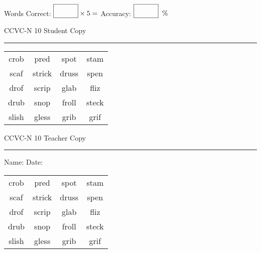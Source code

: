 \documentclass{memoir}
\begin{document}
\small

Words Correct: $\fbox{\phantom{\huge 100}} \times 5 = $ Accuracy: $\fbox{\phantom{\huge 100}}\;\; \%$ 

\vfill

\newpage


\footnotesize \noindent
CCVC-N 10 \hfill Student Copy
\smallskip
\hrule

\Large

\setlength{\tabcolsep}{14pt}
\def\arraystretch{3}

{\selectfont


\begin{vplace}[0.5]
\begin{center}
\begin{tabular}{cccc}
crob & pred & spot & stam            \\
scaf & strick & druss & spen \\
drof & scrip & glab & fliz \\
drub             & snop & froll & steck \\
slish & gless & grib     & grif      \\
\end{tabular}
\end{center}
\end{vplace}

}

\newpage

\footnotesize \noindent
CCVC-N 10 \hfill Teacher Copy
\smallskip
\hrule

\small

\vfill

\noindent
Name: \underline{\hspace{1.75in}} \hfill Date: \underline{\hspace{1in}}

\Large

{\selectfont


\begin{vplace}[0.5]
\begin{center}
\begin{tabular}{cccc}
crob & pred & spot & stam            \\
scaf & strick & druss & spen \\
drof & scrip & glab & fliz \\
drub             & snop & froll & steck \\
slish & gless & grib     & grif      \\
\end{tabular}
\end{center}
\end{vplace}



}
\end{document}
